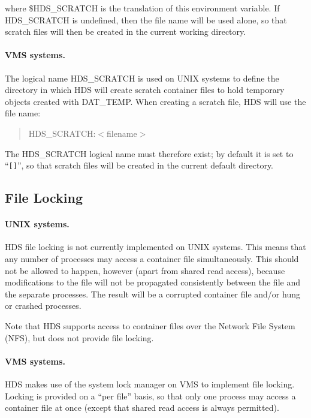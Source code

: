 where \$HDS\_SCRATCH is the translation of this environment variable. If
HDS\_SCRATCH is undefined, then the file name will be used alone, so that
scratch files will then be created in the current working directory.

\paragraph{VMS systems.} The logical name HDS\_SCRATCH is used on UNIX systems
to define the directory in which HDS will create scratch container files to hold
temporary objects created with DAT\_TEMP. When creating a scratch file, HDS will
use the file name:

\begin{quote}
HDS\_SCRATCH:$<$filename$>$
\end{quote}

The HDS\_SCRATCH logical name must therefore exist; by default it is set to
``\verb#[]#'', so that scratch files will be created in the current default
directory.

\subsection{File Locking}

\paragraph{UNIX systems.} HDS file locking is not currently implemented on UNIX
systems. This means that any number of processes may access a container file
simultaneously. This should not be allowed to happen, however (apart from shared
read access), because modifications to the file will not be propagated
consistently between the file and the separate processes. The result will be a
corrupted container file and/or hung or crashed processes.

Note that HDS supports access to container files over the Network File System
(NFS), but does not provide file locking.

\paragraph{VMS systems.} HDS makes use of the system lock manager on VMS to
implement file locking. Locking is provided on a ``per file'' basis, so that
only one process may access a container file at once (except that shared read
access is always permitted).

\newpage
